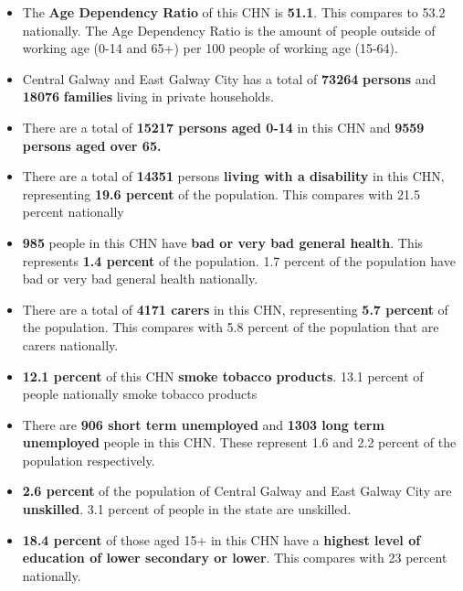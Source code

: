 \documentclass{article}
\begin{document}
\begin{itemize}

\item The \textbf{Age Dependency Ratio} of this CHN is  \textbf{51.1}. This compares to 53.2 nationally. The Age Dependency Ratio is the amount of people outside of working age (0-14 and 65+) per 100 people of working age (15-64). 

\item Central Galway and East Galway City has a total of \textbf{\num{73264}} \textbf{persons} and  \textbf{\num{18076}} \textbf{families} living in private households.

\item There are a total of \textbf{\num{15217} persons aged 0-14} in this CHN and \textbf{\num{9559} persons aged over 65.} 

\item There are a total of \textbf{\num{14351}} persons \textbf{living with a disability} in this CHN, representing \textbf{19.6 percent} of the population. This compares with  21.5 percent nationally

\item \textbf{\num{985}} people in this CHN have \textbf{bad or very bad general health}. This represents \textbf{1.4 percent} of the population. 1.7 percent of the population have bad or very bad general health nationally. 

\item There are a total of \textbf{\num{4171} carers} in this CHN, representing \textbf{5.7 percent} of the population. This compares with 5.8 percent of the population that are carers nationally. 

\item \textbf{12.1 percent} of this CHN \textbf{smoke tobacco products}. 13.1 percent of people nationally smoke tobacco products

\item There are \textbf{\num{906} short term unemployed} and \textbf{\num{1303} long term unemployed} people in this CHN. These represent 1.6 and 2.2 percent of the population respectively.

\item  \textbf{2.6 percent} of the population of Central Galway and East Galway City are \textbf{unskilled}. 3.1 percent of people in the state are unskilled.

\item \textbf{18.4 percent} of those aged 15+ in this CHN have a \textbf{highest level of education of lower secondary or lower}. This compares with 23 percent nationally. 


\end{itemize}
\end{document}
